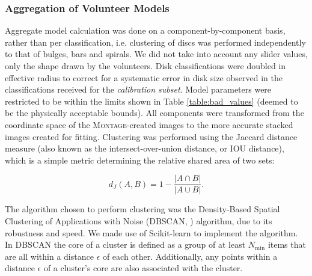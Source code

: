 \documentclass[trackchanges]{aastex63}
\begin{document}
\subsubsection{Aggregation of Volunteer Models}
\label{sec:aggregation_of_volunteer_models}

Aggregate model calculation was done on a component-by-component basis, rather than per classification, i.e. clustering of discs was performed independently to that of bulges, bars and spirals. We did not take into account any slider values, only the shape drawn by the volunteers. Disk classifications were doubled in effective radius to correct for a systematic error in disk size observed in the classifications received for the \textit{calibration subset}. Model parameters were restricted to be within the limits shown in Table \ref{table:bad_values} (deemed to be the physically acceptable bounds). All components were transformed from the coordinate space of the \textsc{Montage}-created images to the more accurate stacked images created for fitting. Clustering was performed using the Jaccard distance measure (also known as the intersect-over-union distance, or IOU distance), which is a simple metric determining the relative shared area of two sets:

\begin{equation}
d_J(A, B) = 1 - \frac{|A \cap B|}{|A \cup B|}.
\end{equation}

The algorithm chosen to perform clustering was the Density-Based Spatial Clustering of Applications with Noise (DBSCAN, \citealt{dbscan}) algorithm, due to its robustness and speed. We made use of Scikit-learn \citep{scikit-learn} to implement the algorithm. In DBSCAN the core of a cluster is defined as a group of at least $N_\mathrm{min}$ items that are all within a distance $\epsilon$ of each other. Additionally, any points within a distance $\epsilon$ of a cluster's core are also associated with the cluster.
\end{document}
